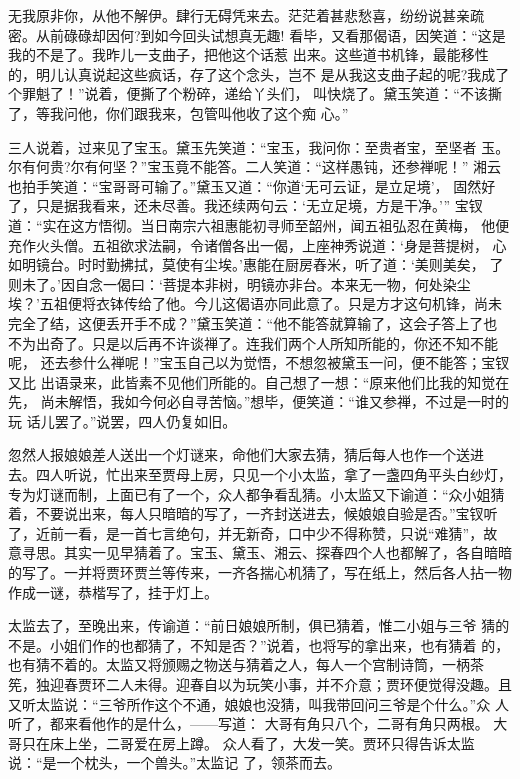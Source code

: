 无我原非你，从他不解伊。肆行无碍凭来去。茫茫着甚悲愁喜，纷纷说甚亲疏
密。从前碌碌却因何?到如今回头试想真无趣!
看毕，又看那偈语，因笑道：“这是我的不是了。我昨儿一支曲子，把他这个话惹
出来。这些道书机锋，最能移性的，明儿认真说起这些疯话，存了这个念头，岂不
是从我这支曲子起的呢?我成了个罪魁了！”说着，便撕了个粉碎，递给丫头们，
叫快烧了。黛玉笑道：“不该撕了，等我问他，你们跟我来，包管叫他收了这个痴
心。”

三人说着，过来见了宝玉。黛玉先笑道：“宝玉，我问你：至贵者宝，至坚者
玉。尔有何贵?尔有何坚？”宝玉竟不能答。二人笑道：“这样愚钝，还参禅呢！”
湘云也拍手笑道：“宝哥哥可输了。”黛玉又道：“你道‘无可云证，是立足境’，
固然好了，只是据我看来，还未尽善。我还续两句云：‘无立足境，方是干净。’”
宝钗道：“实在这方悟彻。当日南宗六祖惠能初寻师至韶州，闻五祖弘忍在黄梅，
他便充作火头僧。五祖欲求法嗣，令诸僧各出一偈，上座神秀说道：‘身是菩提树，
心如明镜台。时时勤拂拭，莫使有尘埃。’惠能在厨房舂米，听了道：‘美则美矣，
了则未了。’因自念一偈曰：‘菩提本非树，明镜亦非台。本来无一物，何处染尘
埃？’五祖便将衣钵传给了他。今儿这偈语亦同此意了。只是方才这句机锋，尚未
完全了结，这便丢开手不成？”黛玉笑道：“他不能答就算输了，这会子答上了也
不为出奇了。只是以后再不许谈禅了。连我们两个人所知所能的，你还不知不能呢，
还去参什么禅呢！”宝玉自己以为觉悟，不想忽被黛玉一问，便不能答；宝钗又比
出语录来，此皆素不见他们所能的。自己想了一想：“原来他们比我的知觉在先，
尚未解悟，我如今何必自寻苦恼。”想毕，便笑道：“谁又参禅，不过是一时的玩
话儿罢了。”说罢，四人仍复如旧。

忽然人报娘娘差人送出一个灯谜来，命他们大家去猜，猜后每人也作一个送进
去。四人听说，忙出来至贾母上房，只见一个小太监，拿了一盏四角平头白纱灯，
专为灯谜而制，上面已有了一个，众人都争看乱猜。小太监又下谕道：“众小姐猜
着，不要说出来，每人只暗暗的写了，一齐封送进去，候娘娘自验是否。”宝钗听
了，近前一看，是一首七言绝句，并无新奇，口中少不得称赞，只说“难猜”，故
意寻思。其实一见早猜着了。宝玉、黛玉、湘云、探春四个人也都解了，各自暗暗
的写了。一并将贾环贾兰等传来，一齐各揣心机猜了，写在纸上，然后各人拈一物
作成一谜，恭楷写了，挂于灯上。

太监去了，至晚出来，传谕道：“前日娘娘所制，俱已猜着，惟二小姐与三爷
猜的不是。小姐们作的也都猜了，不知是否？”说着，也将写的拿出来，也有猜着
的，也有猜不着的。太监又将颁赐之物送与猜着之人，每人一个宫制诗筒，一柄茶
筅，独迎春贾环二人未得。迎春自以为玩笑小事，并不介意；贾环便觉得没趣。且
又听太监说：“三爷所作这个不通，娘娘也没猜，叫我带回问三爷是个什么。”众
人听了，都来看他作的是什么，——写道：
大哥有角只八个，二哥有角只两根。
大哥只在床上坐，二哥爱在房上蹲。
众人看了，大发一笑。贾环只得告诉太监说：“是一个枕头，一个兽头。”太监记
了，领茶而去。

